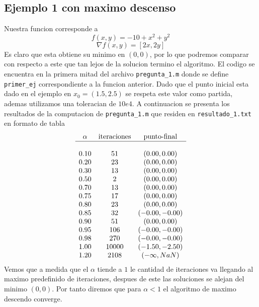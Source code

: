 \documentclass[letterpaper]{article}
\begin{document}
\subsection*{Ejemplo 1 con maximo descenso}
\noindent Nuestra funcion corresponde a
\[ f(x,y) = -10 + x^2 + y^2\]
\[ \nabla f (x,y) = [2 x , 2 y ] \]
Es claro que esta obtiene su minimo en \((0,0)\), por lo que podremos
comparar con respecto a este que tan lejos de la solucion termino el
algoritmo. El codigo se encuentra en la primera mitad del archivo
\texttt{pregunta\_1.m} donde se define \texttt{primer\_ej}
correspondiente a la funcion anterior. Dado que el punto inicial esta
dado en el ejemplo en \(x_0 = (1.5, 2.5)\) se respeta este valor como
partida, ademas utilizamos una toleracian de \(10e4\). A continuacion se
presenta los resultados de la computacion de \texttt{pregunta\_1.m} que
residen en \texttt{resultado\_1.txt} en formato de tabla
\[
\begin{array}{c c c}
  \alpha & \text{iteraciones} & \text{punto-final} \\
  \hline \\
  0.10 & 51    & (0.00, 0.00)   \\
  0.20 & 23    & (0.00, 0.00)   \\
  0.30 & 13    & (0.00, 0.00)   \\
  0.50 & 2     & (0.00, 0.00)   \\
  0.70 & 13    & (0.00, 0.00)   \\
  0.75 & 17    & (0.00, 0.00)   \\
  0.80 & 23    & (0.00, 0.00)   \\
  0.85 & 32    & (-0.00, -0.00) \\
  0.90 & 51    & (0.00, 0.00)   \\
  0.95 & 106   & (-0.00, -0.00) \\
  0.98 & 270   & (-0.00, -0.00) \\
  1.00 & 10000 & (-1.50, -2.50) \\
  1.20 & 2108  & (-\infty, NaN) \\
\end{array}
\]
Vemos que a medida que el \(\alpha\) tiende a \(1\) le cantidad de
iteraciones va llegando al maximo predefinido de iteraciones, despues de
este las soluciones se alejan del minimo \((0,0)\). Por tanto diremos que
para \(\alpha < 1\) el algoritmo de maximo descendo converge.
\end{document}
